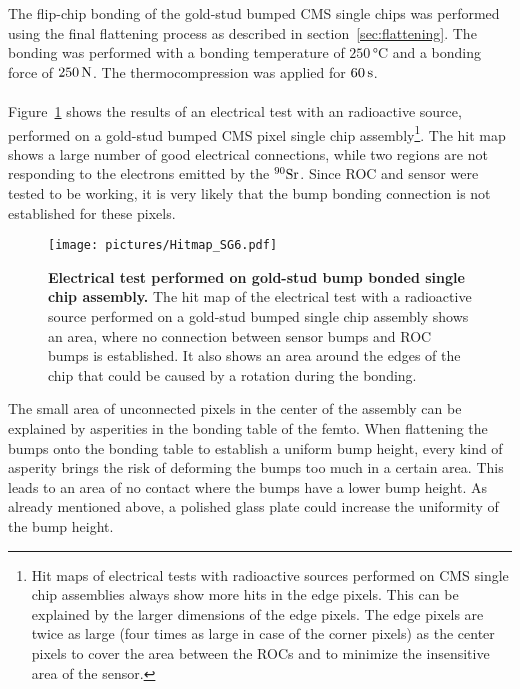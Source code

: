 The flip-chip bonding of the gold-stud bumped \ac{CMS} single chips was performed using the final flattening process as described in section~\ref{sec:flattening}. The bonding was performed with a bonding temperature of $250\,\si{\degreeCelsius}$ and a bonding force of $250\,\rm{N}$. The thermocompression was applied for $60\,\rm{s}$.
\\
\\Figure~\ref{fig:source_test} shows the results of an electrical test with an radioactive source, performed on a gold-stud bumped \ac{CMS} pixel single chip assembly\footnote{Hit maps of electrical tests with radioactive sources performed on \ac{CMS} single chip assemblies always show more hits in the edge pixels. This can be explained by the larger dimensions of the edge pixels. The edge pixels are twice as large (four times as large in case of the corner pixels) as the center pixels to cover the area between the \ac{ROC}s and to minimize the insensitive area of the sensor.}. The hit map shows a large number of good electrical connections, while two regions are not responding to the electrons emitted by the $^{90}\rm{Sr}$. Since \ac{ROC} and sensor were tested to be working, it is very likely that the bump bonding connection is not established for these pixels.
\begin{figure}
\begin{center}
\texttt{[image: pictures/Hitmap\_SG6.pdf]}
\end{center}
\caption[Electrical test performed on gold-stud bump bonded single chip assembly]{\textbf{Electrical test performed on gold-stud bump bonded single chip assembly.} The hit map of the electrical test with a radioactive source performed on a gold-stud bumped single chip assembly shows an area, where no connection between sensor bumps and \ac{ROC} bumps is established. It also shows an area around the edges of the chip that could be caused by a rotation during the bonding.}\label{fig:source_test}
\end{figure}

The small area of unconnected pixels in the center of the assembly can be explained by asperities in the bonding table of the femto. When flattening the bumps onto the bonding table to establish a uniform bump height, every kind of asperity brings the risk of deforming the bumps too much in a certain area. This leads to an area of no contact where the bumps have a lower bump height. As already mentioned above, a polished glass plate could increase the uniformity of the bump height.

